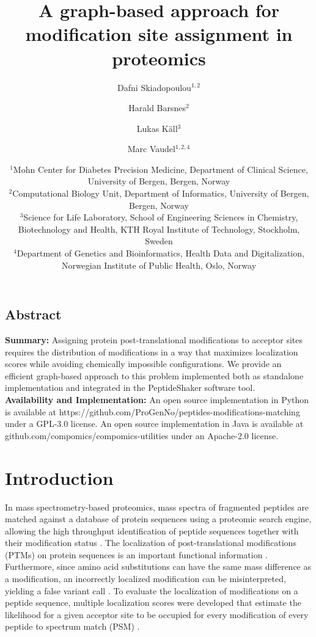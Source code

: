 \documentclass[]{article}
\title{A graph-based approach for modification site assignment in proteomics}
\author{Dafni Skiadopoulou$^{1,2}$ \and Harald Barsnes$^{2}$ \and Lukas Käll$^{3}$ \and Marc Vaudel$^{1,2,4}$}
\date{%
	$^1$Mohn Center for Diabetes Precision Medicine,
	Department of Clinical Science,
	University of Bergen, Bergen, Norway\\%
	$^2$Computational Biology Unit,
	Department of Informatics,
	University of Bergen, Bergen, Norway\\%
	$^3$Science for Life Laboratory,
	School of Engineering Sciences in Chemistry, Biotechnology and Health,
	KTH Royal Institute of Technology, Stockholm, Sweden\\
	$^4$Department of Genetics and Bioinformatics, Health Data and Digitalization,
	Norwegian Institute of Public Health, Oslo, Norway\\
}
\begin{document}
	
\maketitle

\subsection*{Abstract} 

\textbf{Summary:} 
	Assigning protein post-translational modifications to acceptor sites requires the distribution of modifications in a way that maximizes localization scores while avoiding chemically impossible configurations. We provide an efficient graph-based approach to this problem implemented both as standalone implementation and integrated in the PeptideShaker software tool. \\
\textbf{Availability and Implementation:} 
	An open source implementation in Python is available at https://github.com/ProGenNo/peptides-modifications-matching under a GPL-3.0 license. An open source implementation in Java is available at github.com/compomics/compomics-utilities under an Apache-2.0 license. \\

\maketitle

\section{Introduction}

In mass spectrometry-based proteomics, mass spectra of fragmented peptides are matched against a database of protein sequences using a proteomic search engine, allowing the high throughput identification of peptide sequences together with their modification status \cite{Mass_spec_proteomics}. The localization of post-translational modifications (PTMs) on protein sequences is an important functional information \cite{Phosphoproteomics}. Furthermore, since amino acid substitutions can have the same mass difference as a modification, an incorrectly localized modification can be misinterpreted, yielding a false variant call \cite{SNPs_PTMs_same_mass}. To evaluate the localization of modifications on a peptide sequence, multiple localization scores were developed that estimate the likelihood for a given acceptor site to be occupied for every modification of every peptide to spectrum match (PSM) \cite{Localization_scoring, computational_phosphoproteomics}.
\end{document}
